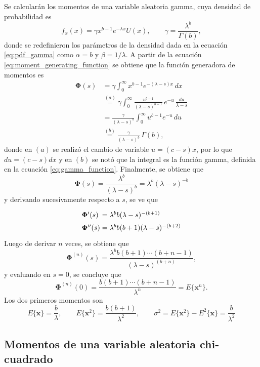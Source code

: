 \documentclass[a4paper]{report}
\newcommand{\x}{\mathbf{x}}
\newcommand{\Phibf}{\mathbf{\Phi}}
\begin{document}
Se calcularán los momentos de una variable aleatoria gamma, cuya densidad de probabilidad es
\begin{equation}\label{eq:pdf_gamma_b_lambda}
 f_x(x)=\gamma x^{b-1}e^{-\lambda x}U(x),\qquad\gamma=\frac{\lambda^b}{\Gamma(b)},
\end{equation}
donde se redefinieron los parámetros de la densidad dada en la ecuación \ref{eq:pdf_gamma} como \(\alpha=b\) y \(\beta=1/\lambda\). A partir de la ecuación \ref{eq:moment_generating_function} se obtiene que la función generadora de momentos es
\begin{align*}
 \Phibf(s)&=\gamma\int_{0}^{\infty}x^{b-1}e^{-(\lambda-s) x}\,dx\\
    &\overset{(a)}{=}\gamma\int_{0}^{\infty}\frac{u^{b-1}}{(\lambda-s)^{b-1}}\,e^{-u}\,\frac{du}{\lambda-s}\\
    &=\frac{\gamma}{(\lambda-s)^b}\int_{0}^{\infty}u^{b-1}e^{-u}\,du\\
    &\overset{(b)}{=}\frac{\gamma}{(\lambda-s)^b}\,\Gamma(b),
\end{align*}
donde en \((a)\) se realizó el cambio de variable \(u=(c-s)x\), por lo que \(du=(c-s)dx\) y en \((b)\) se notó que la integral es la función gamma, definida en la ecuación \ref{eq:gamma_function}. Finalmente, se obtiene que
\begin{equation}\label{eq:gamma_moment_generating_function}
 \Phibf(s)=\frac{\lambda^b}{(\lambda-s)^b}=\lambda^b(\lambda-s)^{-b}
\end{equation}
y derivando sucesivamente respecto a \(s\), se ve que
\[\arraycolsep=1.4pt\def\arraystretch{1.5}
 \begin{array}{lcl}
 \Phibf'(s)&=&\lambda^bb(\lambda-s)^{-(b+1)}\\
 \Phibf''(s)&=&\lambda^bb(b+1)(\lambda-s)^{-(b+2)}
 \end{array}
\]
Luego de derivar \(n\) veces, se obtiene que
\begin{equation}\label{eq:gamma_moment_generating_function_n_derivative}
 \Phibf^{(n)}(s)=\frac{\lambda^bb(b+1)\cdots(b+n-1)}{(\lambda-s)^{(b+n)}},
\end{equation}
y evaluando en \(s=0\), se concluye que
\[
 \Phibf^{(n)}(0)=\frac{b(b+1)\cdots(b+n-1)}{\lambda^n}=E\{\x^n\}.
\]
Los dos primeros momentos son
\[
 E\{\x\}=\frac{b}{\lambda},\qquad E\{\x^2\}=\frac{b(b+1)}{\lambda^2},\qquad\sigma^2=E\{\x^2\}-E^2\{\x\}=\frac{b}{\lambda^2}
\]

\subsection{Momentos de una variable aleatoria chi-cuadrado}\label{sec:chi_square_moments}
\end{document}
